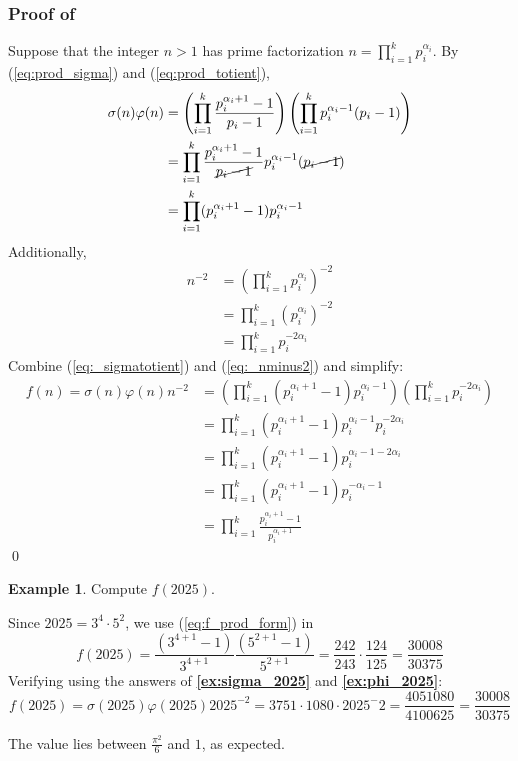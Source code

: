 \documentclass[a4paper, 12pt]{article}
\theoremstyle{definition}
\newtheorem{example}{Example}
\begin{document}
\subsubsection*{Proof of }
Suppose that the integer $n>1$ has prime factorization $n=\prod_{i=1}^{k}p_i^{\alpha_i}$.
By (\ref{eq:prod_sigma}) and (\ref{eq:prod_totient}),
\begin{align}
  \sigma(n)\varphi(n) &= \left(\prod_{i=1}^{k} \frac{p_i^{\alpha_i+1}-1}{p_i-1}\right)
                         \left(\prod_{i=1}^{k} p_i^{\alpha_i-1}(p_i-1)\right)\\
    &= \prod_{i=1}^{k} \frac{p_i^{\alpha_i+1}-1}{\cancel{p_i-1}} p_i^{\alpha_i-1}(\cancel{p_i-1})\\
    &= \prod_{i=1}^{k} (p_i^{\alpha_i+1}-1)p_i^{\alpha_i-1} \label{eq:_sigmatotient}
\end{align}
Additionally,
\begin{align}
  n^{-2} &= \left(\prod_{i=1}^{k}p_i^{\alpha_i}\right)^{-2}\\
         &= \prod_{i=1}^{k}(p_i^{\alpha_i})^{-2}\\
         &= \prod_{i=1}^{k}p_i^{-2\alpha_i} \label{eq:_nminus2}
\end{align}
Combine (\ref{eq:_sigmatotient}) and (\ref{eq:_nminus2}) and simplify:
\begin{align}
  f(n)=\sigma(n)\varphi(n) n^{-2} &= \left(\prod_{i=1}^{k} (p_i^{\alpha_i+1}-1)p_i^{\alpha_i-1}\right)
                                \left(\prod_{i=1}^{k}p_i^{-2\alpha_i}\right)\\
    &=\prod_{i=1}^{k} (p_i^{\alpha_i+1}-1)p_i^{\alpha_i-1} p_i^{-2\alpha_i}\\
    &=\prod_{i=1}^{k} (p_i^{\alpha_i+1}-1)p_i^{\alpha_i-1-2\alpha_i}\\
    &=\prod_{i=1}^{k} (p_i^{\alpha_i+1}-1)p_i^{-\alpha_i-1}\\
    &=\prod_{i=1}^{k} \frac{p_i^{\alpha_i+1}-1}{p_i^{\alpha_i+1}}
\end{align}
\qed

\vspace{1em}\begin{example}
  Compute $f(2025)$.

  Since $2025 = 3^4\cdot 5^2$, we use (\ref{eq:f_prod_form}) in \textbf{}
  \[f(2025)=\frac{(3^{4+1}-1)}{3^{4+1}}\frac{(5^{2+1}-1)}{5^{2+1}} = \frac{242}{243}\cdot\frac{124}{125}=\frac{30008}{30375}\]
  Verifying using the answers of \textbf{\ref{ex:sigma_2025}} and \textbf{\ref{ex:phi_2025}}:
  \[f(2025) = \sigma(2025)\varphi(2025) 2025^{-2} = 3751\cdot1080 \cdot 2025^-2 = \frac{4051080}{4100625} = \frac{30008}{30375}\]

  The value lies between $\frac{\pi^2}{6}$ and $1$, as expected.
\end{example}\vspace{1em}
\end{document}
